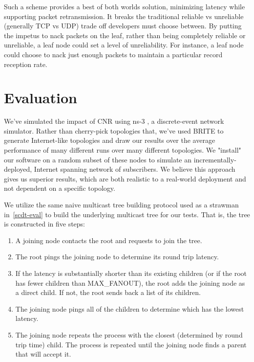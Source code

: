Such a scheme provides a best of both worlds solution, minimizing latency while
supporting packet retransmission.  It breaks the
traditional reliable vs unreliable (generally TCP vs UDP) trade off developers
must choose between.  By putting the impetus to nack packets on the leaf, rather
than being completely reliable or unreliable, a leaf node could set a level of
unreliability.  For instance, a leaf node could choose to nack just enough
packets to maintain a particular record reception rate.


\section{Evaluation}

We've simulated the impact of CNR using ns-3 \cite{ns3}, a discrete-event network simulator. Rather than cherry-pick topologies that, we've used BRITE \cite{brite} to generate Internet-like topologies and draw our results over the average performance of many different runs over many different topologies. We "install" our software on a random subset of these nodes to simulate an incrementally-deployed, Internet spanning network of subscribers. We believe this approach gives us superior results, which are both realistic to a real-world deployment and not dependent on a specific topology. 

We utilize the same naive multicast tree building protocol used as a strawman in~\autoref{scdt-eval} to build the underlying multicast tree for our tests. That is, the tree is constructed in five steps: 

\begin{enumerate}  
	\item A joining node contacts the root and requests to join the tree. 
	\item The root pings the joining node to determine its round trip latency. 
	\item If the latency is substantially shorter than its existing children (or if the root has fewer children than MAX\_FANOUT), the root adds the joining node as a direct child. If not, the root sends back a list of its children.
	\item The joining node pings all of the children to determine which has the lowest latency.
	\item The joining node repeats the process with the closest (determined by round trip time) child. The process is repeated until the joining node finds a parent that will accept it.
\end{enumerate}

